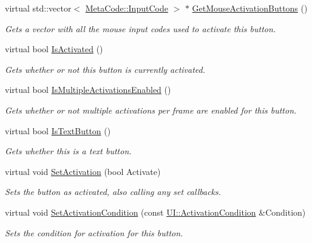 \begin{DoxyCompactItemize}
virtual std::vector$<$ \hyperlink{classMezzanine_1_1MetaCode_a3b5633f0145bf3287cf53a3f05b5563c}{MetaCode::InputCode} $>$ $\ast$ \hyperlink{classMezzanine_1_1UI_1_1Button_a41d41a678b9164806fff2a17acabf1ae}{GetMouseActivationButtons} ()
\begin{DoxyCompactList}\small\item\em Gets a vector with all the mouse input codes used to activate this button. \item\end{DoxyCompactList}\item 
virtual bool \hyperlink{classMezzanine_1_1UI_1_1Button_a1b64587eec4d23911c488edf40c7a0c7}{IsActivated} ()
\begin{DoxyCompactList}\small\item\em Gets whether or not this button is currently activated. \item\end{DoxyCompactList}\item 
virtual bool \hyperlink{classMezzanine_1_1UI_1_1Button_a4aff4ca86ab252ef8796a9cba203041e}{IsMultipleActivationsEnabled} ()
\begin{DoxyCompactList}\small\item\em Gets whether or not multiple activations per frame are enabled for this button. \item\end{DoxyCompactList}\item 
virtual bool \hyperlink{classMezzanine_1_1UI_1_1Button_a37a43c703a3f7bc8a59c8940ba53afe1}{IsTextButton} ()
\begin{DoxyCompactList}\small\item\em Gets whether this is a text button. \item\end{DoxyCompactList}\item 
virtual void \hyperlink{classMezzanine_1_1UI_1_1Button_a89d0a1d2b0023be59e864b3c125f0dea}{SetActivation} (bool Activate)
\begin{DoxyCompactList}\small\item\em Sets the button as activated, also calling any set callbacks. \item\end{DoxyCompactList}\item 
virtual void \hyperlink{classMezzanine_1_1UI_1_1Button_a6c99108a01d71c521318640f52d2ee11}{SetActivationCondition} (const \hyperlink{namespaceMezzanine_1_1UI_aca58497951b1b9c7da10f214da3392f0}{UI::ActivationCondition} \&Condition)
\begin{DoxyCompactList}\small\item\em Sets the condition for activation for this button. \item\end{DoxyCompactList}\item 

\end{DoxyCompactItemize}
